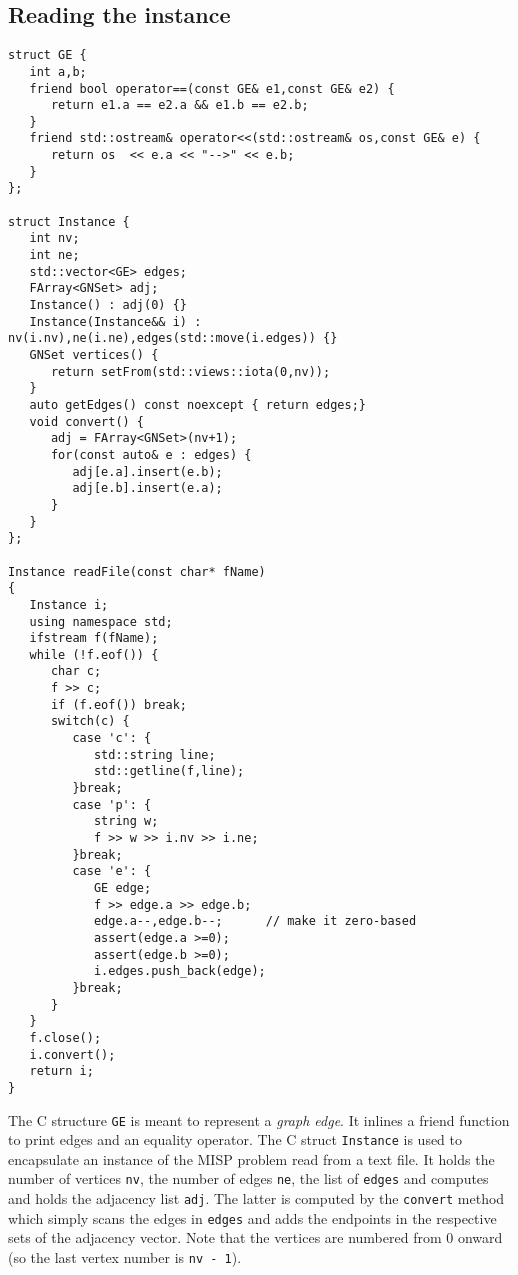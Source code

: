 \documentclass[11pt]{article}
\begin{document}
\subsection{Reading the instance}
\label{sec:org97e1248}
\begin{verbatim}
struct GE {
   int a,b;
   friend bool operator==(const GE& e1,const GE& e2) {
      return e1.a == e2.a && e1.b == e2.b;
   }
   friend std::ostream& operator<<(std::ostream& os,const GE& e) {
      return os  << e.a << "-->" << e.b;
   }
};

struct Instance {
   int nv;
   int ne;
   std::vector<GE> edges;
   FArray<GNSet> adj;
   Instance() : adj(0) {}
   Instance(Instance&& i) : nv(i.nv),ne(i.ne),edges(std::move(i.edges)) {}
   GNSet vertices() {
      return setFrom(std::views::iota(0,nv));
   }
   auto getEdges() const noexcept { return edges;}
   void convert() {
      adj = FArray<GNSet>(nv+1);
      for(const auto& e : edges) {
         adj[e.a].insert(e.b);
         adj[e.b].insert(e.a);
      }         
   }
};

Instance readFile(const char* fName)
{
   Instance i;
   using namespace std;
   ifstream f(fName);
   while (!f.eof()) {
      char c;
      f >> c;
      if (f.eof()) break;
      switch(c) {
         case 'c': {
            std::string line;
            std::getline(f,line);
         }break;
         case 'p': {
            string w;
            f >> w >> i.nv >> i.ne;
         }break;
         case 'e': {
            GE edge;
            f >> edge.a >> edge.b;
            edge.a--,edge.b--;      // make it zero-based
            assert(edge.a >=0);
            assert(edge.b >=0);
            i.edges.push_back(edge);
         }break;
      }
   }
   f.close();
   i.convert();
   return i;
}  
\end{verbatim}

The C structure \texttt{GE} is meant to represent a \emph{graph edge}. It inlines a friend function to print edges and an equality operator.  The C struct \texttt{Instance} is used to encapsulate
an instance of the MISP problem read from a text file. It holds the number of vertices \texttt{nv}, the number of edges \texttt{ne}, the list of \texttt{edges} and computes and holds the adjacency list \texttt{adj}. The latter is computed by the \texttt{convert} method which simply scans the edges
in \texttt{edges} and adds the endpoints in the respective sets of the adjacency vector. Note that the vertices are numbered from 0 onward (so the last vertex number is \texttt{nv - 1}). 
\end{document}
